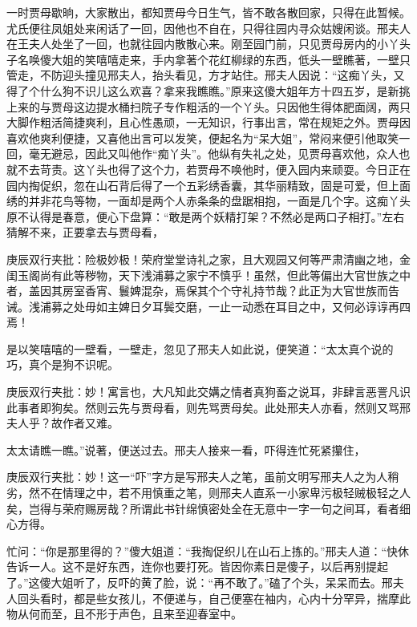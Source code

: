 \begin{parag}
    一时贾母歇晌，大家散出，都知贾母今日生气，皆不敢各散回家，只得在此暂候。尤氏便往凤姐处来闲话了一回，因他也不自在，只得往园内寻众姑嫂闲谈。邢夫人在王夫人处坐了一回，也就往园内散散心来。刚至园门前，只见贾母房内的小丫头子名唤傻大姐的笑嘻嘻走来，手内拿著个花红柳绿的东西，低头一壁瞧著，一壁只管走，不防迎头撞见邢夫人，抬头看见，方才站住。邢夫人因说：“这痴丫头，又得了个什么狗不识儿这么欢喜？拿来我瞧瞧。”原来这傻大姐年方十四五岁，是新挑上来的与贾母这边提水桶扫院子专作粗活的一个丫头。只因他生得体肥面阔，两只大脚作粗活简捷爽利，且心性愚顽，一无知识，行事出言，常在规矩之外。贾母因喜欢他爽利便捷，又喜他出言可以发笑，便起名为“呆大姐”，常闷来便引他取笑一回，毫无避忌，因此又叫他作“痴丫头”。他纵有失礼之处，见贾母喜欢他，众人也就不去苛责。这丫头也得了这个力，若贾母不唤他时，便入园内来顽耍。今日正在园内掏促织，忽在山石背后得了一个五彩绣香囊，其华丽精致，固是可爱，但上面绣的并非花鸟等物，一面却是两个人赤条条的盘踞相抱，一面是几个字。这痴丫头原不认得是春意，便心下盘算：“敢是两个妖精打架？不然必是两口子相打。”左右猜解不来，正要拿去与贾母看，\begin{note}庚辰双行夹批：险极妙极！荣府堂堂诗礼之家，且大观园又何等严肃清幽之地，金闺玉阁尚有此等秽物，天下浅浦募之家宁不慎乎！虽然，但此等偏出大官世族之中者，盖因其房室香宵、鬟婢混杂，焉保其个个守礼持节哉？此正为大官世族而告诫。浅浦募之处毋如主婢日夕耳鬓交磨，一止一动悉在耳目之中，又何必谆谆再四焉！\end{note}是以笑嘻嘻的一壁看，一壁走，忽见了邢夫人如此说，便笑道：“太太真个说的巧，真个是狗不识呢。\begin{note}庚辰双行夹批：妙！寓言也，大凡知此交媾之情者真狗畜之说耳，非肆言恶詈凡识此事者即狗矣。然则云先与贾母看，则先骂贾母矣。此处邢夫人亦看，然则又骂邢夫人乎？故作者又难。\end{note}太太请瞧一瞧。”说著，便送过去。邢夫人接来一看，吓得连忙死紧攥住，\begin{note}庚辰双行夹批：妙！这一“吓”字方是写邢夫人之笔，虽前文明写邢夫人之为人稍劣，然不在情理之中，若不用慎重之笔，则邢夫人直系一小家卑污极轻贼极轻之人矣，岂得与荣府赐房哉？所谓此书针绵慎密处全在无意中一字一句之间耳，看者细心方得。\end{note}忙问：“你是那里得的？”傻大姐道：“我掏促织儿在山石上拣的。”邢夫人道：“快休告诉一人。这不是好东西，连你也要打死。皆因你素日是傻子，以后再别提起了。”这傻大姐听了，反吓的黄了脸，说：“再不敢了。”磕了个头，呆呆而去。邢夫人回头看时，都是些女孩儿，不便递与，自己便塞在袖内，心内十分罕异，揣摩此物从何而至，且不形于声色，且来至迎春室中。
\end{parag}


